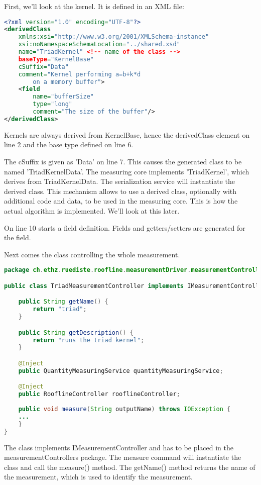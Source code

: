 \documentclass[a4paper,12pt]{article}
\begin{document}
First, we'll look at the kernel. It is defined in
an XML file:
\begin{lstlisting}[language=XML]
<?xml version="1.0" encoding="UTF-8"?>
<derivedClass
	xmlns:xsi="http://www.w3.org/2001/XMLSchema-instance"
	xsi:noNamespaceSchemaLocation="../shared.xsd"
	name="TriadKernel" <!-- name of the class -->
	baseType="KernelBase"
	cSuffix="Data"
	comment="Kernel performing a=b+k*d 
		on a memory buffer">
	<field  
		name="bufferSize" 
		type="long" 
		comment="The size of the buffer"/>
</derivedClass>
\end{lstlisting}

Kernels are always derived from KernelBase, hence the derivedClass element on
line 2 and the base type defined on line 6. 

The cSuffix is given as 'Data' on
line 7. This causes the generated class to be named 'TriadKernelData'. The
measuring core implements 'TriadKernel', which derives from TriadKernelData. The
serialization service will instantiate the derived class. This mechanism allows
to use a derived class, optionally with additional code and data, to be used in
the measuring core. This is how the actual algorithm is implemented. We'll look
at this later.

On line 10 starts a field definition. Fields and getters/setters are generated
for the field.

Next comes the class controlling the whole measurement. 
\begin{lstlisting}[language=JAVA]
package ch.ethz.ruediste.roofline.measurementDriver.measurementControllers;

public class TriadMeasurementController implements IMeasurementController {

	public String getName() {
		return "triad";
	}

	public String getDescription() {
		return "runs the triad kernel";
	}

	@Inject
	public QuantityMeasuringService quantityMeasuringService;

	@Inject
	public RooflineController rooflineController;
	
	public void measure(String outputName) throws IOException {
	...
	}
}
\end{lstlisting}
The class implements IMeasurementController and has to be placed in the
measurementControllers package. The measure command will instantiate the class
and call the measure() method. The getName() method returns the name of the
measurement, which is used to identify the measurement.
\end{document}
